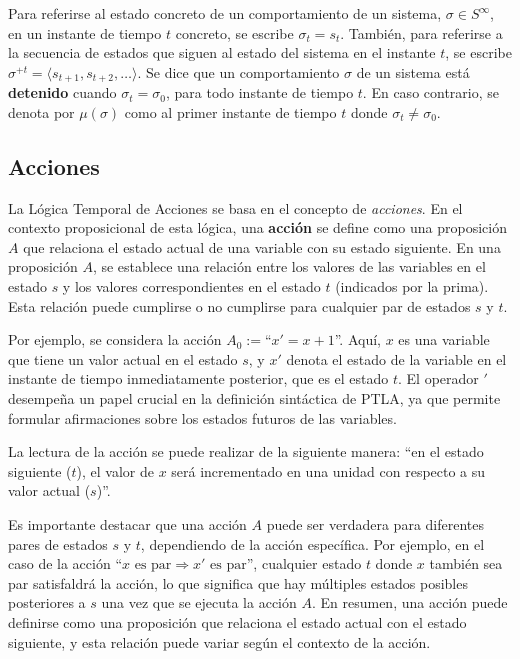 Para referirse al estado concreto de un comportamiento de un sistema, $\sigma \in S^\infty$, en un instante de tiempo $t$ concreto, se escribe $\sigma_t = s_t$. También, para referirse a la secuencia de estados que siguen al estado del sistema en el instante $t$, se escribe $\sigma^{+t} = \langle s_{t+1}, s_{t+2}, \ldots \rangle$. Se dice que un comportamiento $\sigma$ de un sistema está \textbf{detenido} cuando $\sigma_t = \sigma_0$, para todo instante de tiempo $t$. En caso contrario, se denota por $\mu(\sigma)$ como al primer instante de tiempo $t$ donde $\sigma_t \neq \sigma_0$.

\subsection{Acciones}\label{subsection:TLAactions}
La Lógica Temporal de Acciones se basa en el concepto de \textit{acciones}. En el contexto proposicional de esta lógica, una \textbf{acción} se define como una proposición $A$ que relaciona el estado actual de una variable con su estado siguiente. En una proposición $A$, se establece una relación entre los valores de las variables en el estado $s$ y los valores correspondientes en el estado $t$ (indicados por la prima). Esta relación puede cumplirse o no cumplirse para cualquier par de estados $s$ y $t$.

Por ejemplo, se considera la acción $A_0 := $``$x' = x+1$''. Aquí, $x$ es una variable que tiene un valor actual en el estado $s$, y $x'$ denota el estado de la variable en el instante de tiempo inmediatamente posterior, que es el estado $t$. El operador $'$ desempeña un papel crucial en la definición sintáctica de PTLA, ya que permite formular afirmaciones sobre los estados futuros de las variables.

La lectura de la acción se puede realizar de la siguiente manera: ``en el estado siguiente ($t$), el valor de $x$ será incrementado en una unidad con respecto a su valor actual ($s$)''.

Es importante destacar que una acción $A$ puede ser verdadera para diferentes pares de estados $s$ y $t$, dependiendo de la acción específica. Por ejemplo, en el caso de la acción ``$x \text{ es par} \Rightarrow x' \text{ es par}$'', cualquier estado $t$ donde $x$ también sea par satisfaldrá la acción, lo que significa que hay múltiples estados posibles posteriores a $s$ una vez que se ejecuta la acción $A$. En resumen, una acción puede definirse como una proposición que relaciona el estado actual con el estado siguiente, y esta relación puede variar según el contexto de la acción.



